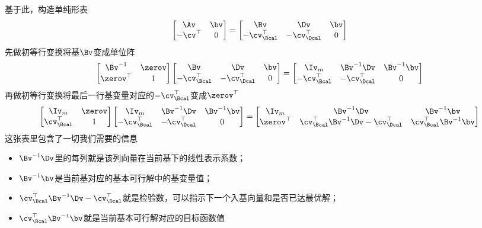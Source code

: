 \documentclass{ctexart}
\begin{document}
基于此，构造单纯形表
\begin{align*}
    \begin{bmatrix}
        \Av & \bv \\ -\cv^\top & 0
    \end{bmatrix} =
    \begin{bmatrix}
        \Bv & \Dv & \bv \\ -\cv_\Bcal^\top & -\cv_\Dcal^\top & 0
    \end{bmatrix}
\end{align*}
先做初等行变换将基$\Bv$变成单位阵
\begin{align*}
    \begin{bmatrix}
        \Bv^{-1} & \zerov \\ \zerov^\top & 1
    \end{bmatrix}
    \begin{bmatrix}
        \Bv & \Dv & \bv \\ -\cv_\Bcal^\top & -\cv_\Dcal^\top & 0
    \end{bmatrix} =
    \begin{bmatrix}
        \Iv_m & \Bv^{-1} \Dv & \Bv^{-1} \bv \\ -\cv_\Bcal^\top & -\cv_\Dcal^\top & 0
    \end{bmatrix}
\end{align*}
再做初等行变换将最后一行基变量对应的$-\cv_\Bcal^\top$变成$\zerov^\top$
\begin{align*}
    \begin{bmatrix}
        \Iv_m & \zerov \\ \cv_\Bcal^\top & 1
    \end{bmatrix}
    \begin{bmatrix}
        \Iv_m & \Bv^{-1} \Dv & \Bv^{-1} \bv \\ -\cv_\Bcal^\top & -\cv_\Dcal^\top & 0
    \end{bmatrix} =
    \begin{bmatrix}
        \Iv_m & \Bv^{-1} \Dv & \Bv^{-1} \bv \\ \zerov^\top & \cv_\Bcal^\top \Bv^{-1} \Dv - \cv_\Dcal^\top & \cv_\Bcal^\top \Bv^{-1} \bv
    \end{bmatrix}
\end{align*}
这张表里包含了一切我们需要的信息
\begin{itemize}
    \item $\Bv^{-1} \Dv$里的每列就是该列向量在当前基下的线性表示系数；
    \item $\Bv^{-1} \bv$是当前基对应的基本可行解中的基变量值；
    \item $\cv_\Bcal^\top \Bv^{-1} \Dv - \cv_\Dcal^\top$就是检验数，可以指示下一个入基向量和是否已达最优解；
    \item $\cv_\Bcal^\top \Bv^{-1} \bv$就是当前基本可行解对应的目标函数值
\end{itemize}
\end{document}
